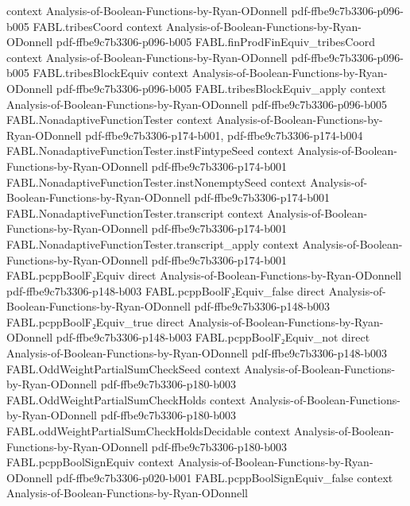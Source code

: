 \begin{theorem}
  {context}
  {Analysis-of-Boolean-Functions-by-Ryan-ODonnell}
  {pdf-ffbe9c7b3306-p096-b005}
\proofstep
  {FABL.tribesCoord}
  {context}
  {Analysis-of-Boolean-Functions-by-Ryan-ODonnell}
  {pdf-ffbe9c7b3306-p096-b005}
\proofstep
  {FABL.finProdFinEquiv_tribesCoord}
  {context}
  {Analysis-of-Boolean-Functions-by-Ryan-ODonnell}
  {pdf-ffbe9c7b3306-p096-b005}
\proofstep
  {FABL.tribesBlockEquiv}
  {context}
  {Analysis-of-Boolean-Functions-by-Ryan-ODonnell}
  {pdf-ffbe9c7b3306-p096-b005}
\proofstep
  {FABL.tribesBlockEquiv_apply}
  {context}
  {Analysis-of-Boolean-Functions-by-Ryan-ODonnell}
  {pdf-ffbe9c7b3306-p096-b005}
\proofstep
  {FABL.NonadaptiveFunctionTester}
  {context}
  {Analysis-of-Boolean-Functions-by-Ryan-ODonnell}
  {pdf-ffbe9c7b3306-p174-b001,
    pdf-ffbe9c7b3306-p174-b004}
\proofstep
  {FABL.NonadaptiveFunctionTester.instFintypeSeed}
  {context}
  {Analysis-of-Boolean-Functions-by-Ryan-ODonnell}
  {pdf-ffbe9c7b3306-p174-b001}
\proofstep
  {FABL.NonadaptiveFunctionTester.instNonemptySeed}
  {context}
  {Analysis-of-Boolean-Functions-by-Ryan-ODonnell}
  {pdf-ffbe9c7b3306-p174-b001}
\proofstep
  {FABL.NonadaptiveFunctionTester.transcript}
  {context}
  {Analysis-of-Boolean-Functions-by-Ryan-ODonnell}
  {pdf-ffbe9c7b3306-p174-b001}
\proofstep
  {FABL.NonadaptiveFunctionTester.transcript_apply}
  {context}
  {Analysis-of-Boolean-Functions-by-Ryan-ODonnell}
  {pdf-ffbe9c7b3306-p174-b001}
\proofstep
  {FABL.pcppBoolF₂Equiv}
  {direct}
  {Analysis-of-Boolean-Functions-by-Ryan-ODonnell}
  {pdf-ffbe9c7b3306-p148-b003}
\proofstep
  {FABL.pcppBoolF₂Equiv_false}
  {direct}
  {Analysis-of-Boolean-Functions-by-Ryan-ODonnell}
  {pdf-ffbe9c7b3306-p148-b003}
\proofstep
  {FABL.pcppBoolF₂Equiv_true}
  {direct}
  {Analysis-of-Boolean-Functions-by-Ryan-ODonnell}
  {pdf-ffbe9c7b3306-p148-b003}
\proofstep
  {FABL.pcppBoolF₂Equiv_not}
  {direct}
  {Analysis-of-Boolean-Functions-by-Ryan-ODonnell}
  {pdf-ffbe9c7b3306-p148-b003}
\proofstep
  {FABL.OddWeightPartialSumCheckSeed}
  {context}
  {Analysis-of-Boolean-Functions-by-Ryan-ODonnell}
  {pdf-ffbe9c7b3306-p180-b003}
\proofstep
  {FABL.OddWeightPartialSumCheckHolds}
  {context}
  {Analysis-of-Boolean-Functions-by-Ryan-ODonnell}
  {pdf-ffbe9c7b3306-p180-b003}
\proofstep
  {FABL.oddWeightPartialSumCheckHoldsDecidable}
  {context}
  {Analysis-of-Boolean-Functions-by-Ryan-ODonnell}
  {pdf-ffbe9c7b3306-p180-b003}
\proofstep
  {FABL.pcppBoolSignEquiv}
  {context}
  {Analysis-of-Boolean-Functions-by-Ryan-ODonnell}
  {pdf-ffbe9c7b3306-p020-b001}
\proofstep
  {FABL.pcppBoolSignEquiv_false}
  {context}
  {Analysis-of-Boolean-Functions-by-Ryan-ODonnell}

\end{theorem}
